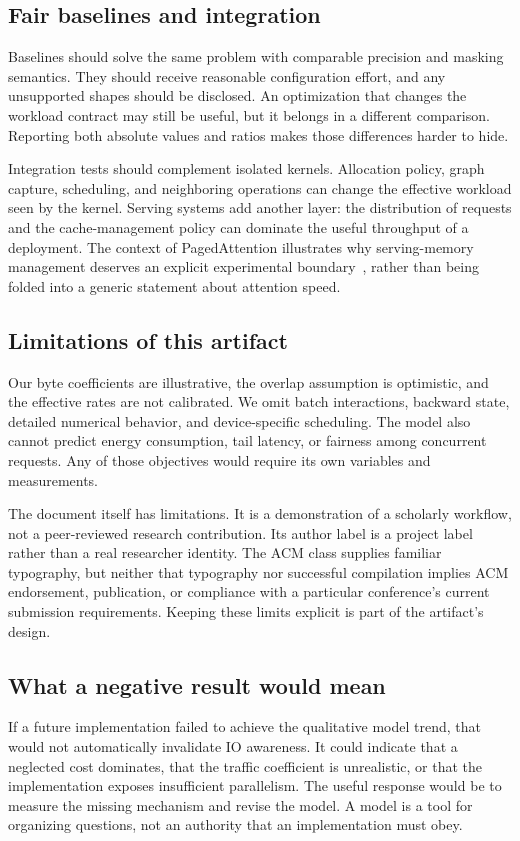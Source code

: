 \subsection{Fair baselines and integration}
Baselines should solve the same problem with comparable precision and masking semantics. They should receive reasonable configuration effort, and any unsupported shapes should be disclosed. An optimization that changes the workload contract may still be useful, but it belongs in a different comparison. Reporting both absolute values and ratios makes those differences harder to hide.

Integration tests should complement isolated kernels. Allocation policy, graph capture, scheduling, and neighboring operations can change the effective workload seen by the kernel. Serving systems add another layer: the distribution of requests and the cache-management policy can dominate the useful throughput of a deployment. The context of PagedAttention illustrates why serving-memory management deserves an explicit experimental boundary~\cite{kwon2023pagedattention}, rather than being folded into a generic statement about attention speed.

\subsection{Limitations of this artifact}
Our byte coefficients are illustrative, the overlap assumption is optimistic, and the effective rates are not calibrated. We omit batch interactions, backward state, detailed numerical behavior, and device-specific scheduling. The model also cannot predict energy consumption, tail latency, or fairness among concurrent requests. Any of those objectives would require its own variables and measurements.

The document itself has limitations. It is a demonstration of a scholarly workflow, not a peer-reviewed research contribution. Its author label is a project label rather than a real researcher identity. The ACM class supplies familiar typography, but neither that typography nor successful compilation implies ACM endorsement, publication, or compliance with a particular conference's current submission requirements. Keeping these limits explicit is part of the artifact's design.

\subsection{What a negative result would mean}
If a future implementation failed to achieve the qualitative model trend, that would not automatically invalidate IO awareness. It could indicate that a neglected cost dominates, that the traffic coefficient is unrealistic, or that the implementation exposes insufficient parallelism. The useful response would be to measure the missing mechanism and revise the model. A model is a tool for organizing questions, not an authority that an implementation must obey.
